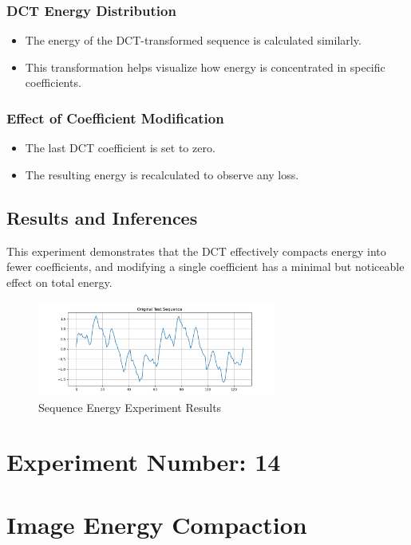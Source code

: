 \documentclass[12pt,a4paper]{article}
\begin{document}
\subsubsection{DCT Energy Distribution}
\begin{itemize}
  \item The energy of the DCT-transformed sequence is calculated similarly.
  \item This transformation helps visualize how energy is concentrated in specific coefficients.
\end{itemize}

\subsubsection{Effect of Coefficient Modification}
\begin{itemize}
  \item The last DCT coefficient is set to zero.
  \item The resulting energy is recalculated to observe any loss.
\end{itemize}

\subsection{Results and Inferences}
This experiment demonstrates that the DCT effectively compacts energy into fewer coefficients, and modifying a single coefficient has a minimal but noticeable effect on total energy.

\begin{figure}[H]
  \centering
  \includegraphics[width=0.7\textwidth]{sequence_energy/sequence_energy.png}
  \caption{Sequence Energy Experiment Results}
  \label{fig:seqenergy}
\end{figure}

\newpage
\section*{Experiment Number: 14}
\section{Image Energy Compaction}
\end{document}
